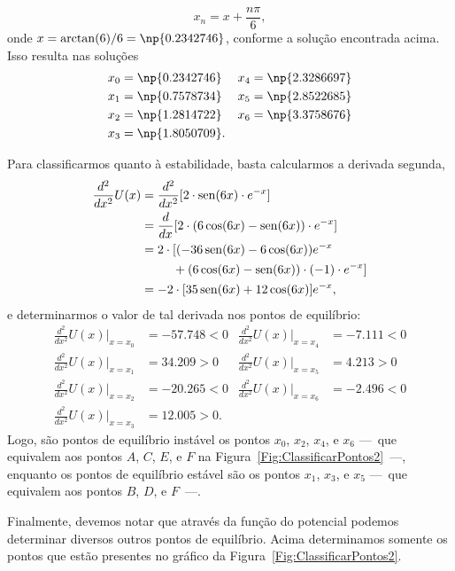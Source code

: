 \begin{equation}
    x_n = x + \frac{n\pi}{6},
\end{equation}
%
onde $x = \arctan(6)/ 6 = \np{0.2342746}$, conforme a solução encontrada acima. Isso resulta nas soluções
\begin{align*}
x_0 &= \np{0.2342746} & x_4 &= \np{2.3286697} \\
x_1 &= \np{0.7578734} & x_5 &= \np{2.8522685} \\
x_2 &= \np{1.2814722} & x_6 &= \np{3.3758676} \\
x_3 &= \np{1.8050709}.
\end{align*}

Para classificarmos quanto à estabilidade, basta calcularmos a derivada segunda,
\begin{align}
    \frac{d^2}{dx^2} U(x) &= \frac{d^2}{dx^2} [2\cdot\operatorname{sen}(6x)\cdot e^{-x}] \\
    &= \frac{d}{dx} [2\cdot(6\cos(6x) - \operatorname{sen}(6x))\cdot e^{-x}] \\
    &= 2\cdot[(-36\operatorname{sen}(6x) - 6\cos(6x)) e^{-x} \\
    &\phantom{=2\cdot[} + (6\cos(6x) - \operatorname{sen}(6x))\cdot(-1)\cdot e^{-x}] \nonumber \\
    &= -2\cdot[35\operatorname{sen}(6x) + 12\cos(6x)]e^{-x},
\end{align}
%
e determinarmos o valor de tal derivada nos pontos de equilíbrio:
\begin{align*}
    \frac{d^2}{dx^2} U(x)|_{x = x_0} &= -57.748 < 0 & \frac{d^2}{dx^2} U(x)|_{x = x_4} &= -7.111 < 0 \\
    \frac{d^2}{dx^2} U(x)|_{x = x_1} &= 34.209 > 0  & \frac{d^2}{dx^2} U(x)|_{x = x_5} &= 4.213 > 0 \\
    \frac{d^2}{dx^2} U(x)|_{x = x_2} &= -20.265 < 0 & \frac{d^2}{dx^2} U(x)|_{x = x_6} &= -2.496 < 0 \\
    \frac{d^2}{dx^2} U(x)|_{x = x_3} &= 12.005 > 0.
\end{align*}
%
Logo, são pontos de equilíbrio instável os pontos $x_0$, $x_2$, $x_4$, e $x_6$ ---~que equivalem aos pontos $A$, $C$, $E$, e $F$ na Figura~\ref{Fig:ClassificarPontos2}~---, enquanto os pontos de equilíbrio estável são os pontos $x_1$, $x_3$, e $x_5$ ---~que equivalem aos pontos $B$, $D$, e $F$~---.

Finalmente, devemos notar que através da função do potencial podemos determinar diversos outros pontos de equilíbrio. Acima determinamos somente os pontos que estão presentes no gráfico da Figura~\ref{Fig:ClassificarPontos2}.

